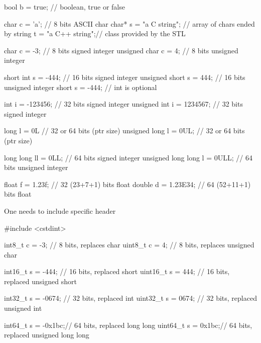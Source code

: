 \begin{frame}[fragile]
  \begin{cppcode}
    bool b = true;            // boolean, true or false

    char c = 'a';             // 8 bits ASCII char
    char* s = "a C string";   // array of chars ended by \0
    string t = "a C++ string";// class provided by the STL

    char c = -3;              // 8 bits signed integer
    unsigned char c = 4;      // 8 bits unsigned integer

    short int s = -444;       // 16 bits signed integer
    unsigned short s = 444;   // 16 bits unsigned integer
    short s = -444;           // int is optional
  \end{cppcode}
\end{frame}
\begin{frame}[fragile]
  \begin{cppcode}
    int i = -123456;          // 32 bits signed integer
    unsigned int i = 1234567; // 32 bits signed integer

    long l = 0L               // 32 or 64 bits (ptr size)
    unsigned long l = 0UL;    // 32 or 64 bits (ptr size)

    long long ll = 0LL;       // 64 bits signed integer
    unsigned long long l = 0ULL; // 64 bits unsigned integer

    float f = 1.23f;          // 32 (23+7+1) bits float
    double d = 1.23E34;       // 64 (52+11+1) bits float
  \end{cppcode}
\end{frame}

\begin{frame}[fragile]
  \alert{One needs to include specific header}
  \begin{cppcode}
    #include <cstdint>

    int8_t c = -3;     // 8 bits, replaces char
    uint8_t c = 4;     // 8 bits, replaces unsigned char

    int16_t s = -444;  // 16 bits, replaced short
    uint16_t s = 444;  // 16 bits, replaced unsigned short

    int32_t s = -0674; // 32 bits, replaced int
    uint32_t s = 0674; // 32 bits, replaced unsigned int

    int64_t s = -0x1bc;// 64 bits, replaced long long
    uint64_t s = 0x1bc;// 64 bits, replaced unsigned long long
    \end{cppcode}
\end{frame}


